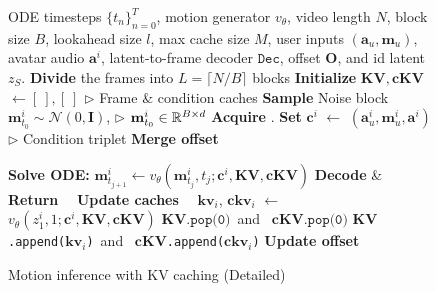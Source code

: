 \begin{figure}[t]
\vspace{-0.15in}
\centering
\begin{minipage}{1.0\linewidth}
\begin{algorithm}[H]
\small 
\caption{\label{algo:sampling_detail} Motion inference with KV caching (Detailed)} 
\begin{algorithmic}[1]
\Require ODE timesteps $\{t_n\}^T_{n=0}$, motion generator $v_{\theta}$, video length $N$, block size $B$, lookahead size $l$, max cache size $M$, user inputs $(\mathbf{a}_{u},\mathbf{m}_{u})$, avatar audio $\mathbf{a}^i$, latent-to-frame decoder $\texttt{Dec}$, offset $\mathbf{O}$, and id latent $z_S$. 
\State \textbf{Divide} the frames into $L = \lceil N / B \rceil$ blocks
\State \textbf{Initialize} $\mathbf{KV}, \mathbf{cKV}$ $\leftarrow [~], [~]$ \hfill $\rhd$ Frame \& condition caches
    \State \textbf{Sample} Noise block $\mathbf{m}_{t_{0}}^{i} \sim \mathcal{N}(0, \mathbf{I})$, \hfill $\rhd$ 
    $\mathbf{m}_{t_{0}}^{i}\in\mathbb{R}^{B \times d}$
    \State \textbf{Acquire} .
    \State \textbf{Set} $\mathbf{c}^i$ $\leftarrow$ $(\mathbf{a}^i_{u}, \mathbf{m}_{u}^i, \mathbf{a}^i)$ \hfill $\rhd$ Condition triplet
    \State \textbf{Merge offset}  

        \State \textbf{Solve ODE:} $\mathbf{m}_{t_{j+1}}^{i} \leftarrow v_{\theta}(\mathbf{m}_{t_j}^{i}, t_j; \mathbf{c}^i, \mathbf{KV}, \mathbf{cKV})$
    \EndFor
    \State \textbf{Decode} \& \textbf{Return}~~ 
    \State \textbf{Update caches}~~ $\mathbf{kv}_i$, $\mathbf{ckv}_i$ $\leftarrow$ $v_{\theta}(z_{1}^{i}, 1; \mathbf{c}^i, \mathbf{KV}, \mathbf{cKV})$    
    \State $\mathbf{KV}{\texttt{.pop(0)}}$~and~  $\mathbf{cKV}{\texttt{.pop(0)}}$
    \EndIf
    \State $\mathbf{KV}${\texttt{.append($\mathbf{kv}_i$)}}~and~ $\mathbf{cKV}${\texttt{.append($\mathbf{ckv}_i$)}}
    \State \textbf{Update offset} 
\EndFor
\end{algorithmic}
\end{algorithm}
\end{minipage}
\vspace{-0.15in}
\end{figure}